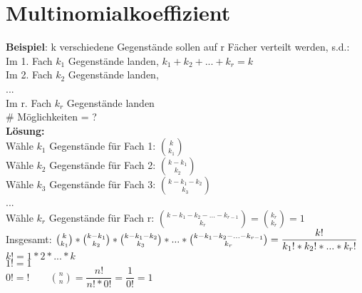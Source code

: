  \section{Multinomialkoeffizient}
 	\textbf{Beispiel}: k verschiedene Gegenstände sollen auf r Fächer verteilt werden, s.d.:\\
 	Im 1. Fach $k_1$ Gegenstände landen, \hspace{1cm} $k_1 +k_2+ ... + k_r = k$\\
 	Im 2. Fach $k_2$ Gegenstände landen,\\...\\
 	Im r. Fach $k_r$ Gegenstände landen\smallskip\\\# Möglichkeiten = ?\medskip\\
 	\textbf{Lösung:}\\
 	 Wähle $k_1$ Gegenstände für Fach 1: $\binom{k}{k_1}$\smallskip\\
 	Wähle $k_2$ Gegenstände für Fach 2: $\binom{k-k_1}{k_2}$\smallskip\\
 	Wähle $k_3$ Gegenstände für Fach 3: $\binom{k-k_1-k_2}{k_3}$\\
 	...\\
 	Wähle $k_r$ Gegenstände für Fach r: $\binom{k-k_1-k_2-...-k_{r-1}}{k_r} = \binom{k_r}{k_r} = 1$\medskip\\
 	Insgesamt: $\binom{k}{k_1}*\binom{k-k_1}{k_2}*\binom{k-k_1-k_2}{k_3}*...*\binom{k-k_1-k_2-...-k_{r-1}}{k_r} = \\\dfrac{k!}{k_1!*k_2!*...*k_r!}$\medskip\\
 	$k! = 1 * 2 * ... * k$\\
 	$1! = 1$\\
 	$0! = ! \qquad \binom{n}{n} = \dfrac{n!}{n!*0!}=\dfrac{1}{0!}=1$

